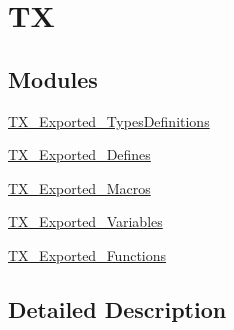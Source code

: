 \hypertarget{group___t_x}{}\section{TX}
\label{group___t_x}
\subsection*{Modules}
\begin{DoxyCompactItemize}
\item 
\mbox{\hyperlink{group___t_x___exported___types_definitions}{T\+X\+\_\+\+Exported\+\_\+\+Types\+Definitions}}
\item 
\mbox{\hyperlink{group___t_x___exported___defines}{T\+X\+\_\+\+Exported\+\_\+\+Defines}}
\item 
\mbox{\hyperlink{group___t_x___exported___macros}{T\+X\+\_\+\+Exported\+\_\+\+Macros}}
\item 
\mbox{\hyperlink{group___t_x___exported___variables}{T\+X\+\_\+\+Exported\+\_\+\+Variables}}
\item 
\mbox{\hyperlink{group___t_x___exported___functions}{T\+X\+\_\+\+Exported\+\_\+\+Functions}}
\end{DoxyCompactItemize}


\subsection{Detailed Description}
